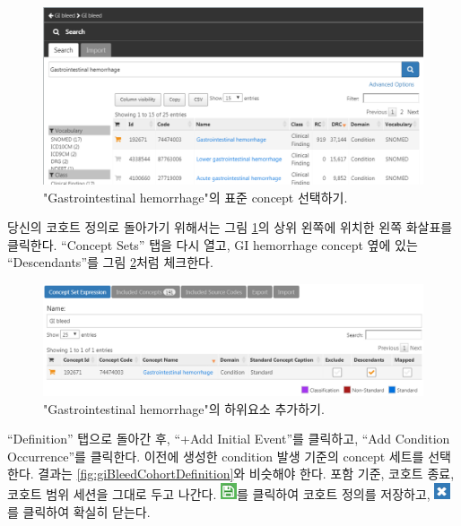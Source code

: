 \documentclass[11pt]{book}
\theoremstyle{definition}
\theoremstyle{definition}
\theoremstyle{definition}
\theoremstyle{remark}
\begin{document}
\begin{figure}

{\centering \includegraphics[width=1\linewidth]{images/SuggestedAnswers/giBleedSearch} 

}

\caption{"Gastrointestinal hemorrhage"의 표준 concept 선택하기.}\label{fig:giBleedSearch}
\end{figure}

당신의 코호트 정의로 돌아가기 위해서는 그림 \ref{fig:giBleedSearch}의
상위 왼쪽에 위치한 왼쪽 화살표를 클릭한다. ``Concept Sets'' 탭을 다시
열고, GI hemorrhage concept 옆에 있는 ``Descendants''를 그림
\ref{fig:giBleedDescendants}처럼 체크한다.

\begin{figure}

{\centering \includegraphics[width=1\linewidth]{images/SuggestedAnswers/giBleedDescendants} 

}

\caption{"Gastrointestinal hemorrhage"의 하위요소 추가하기.}\label{fig:giBleedDescendants}
\end{figure}

``Definition'' 탭으로 돌아간 후, ``+Add Initial Event''를 클릭하고,
``Add Condition Occurrence''를 클릭한다. 이전에 생성한 condition 발생
기준의 concept 세트를 선택한다. 결과는
\ref{fig:giBleedCohortDefinition}와 비슷해야 한다. 포함 기준, 코호트
종료, 코호트 범위 세션을 그대로 두고 나간다.
\includegraphics{images/Cohorts/save.png}를 클릭하여 코호트 정의를
저장하고, \includegraphics{images/SuggestedAnswers/close.png}를 클릭하여
확실히 닫는다.
\end{document}
